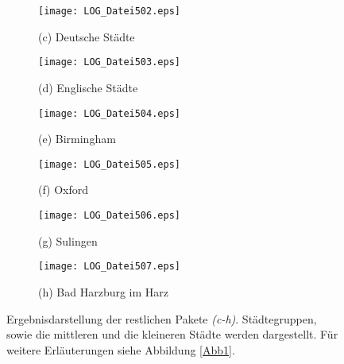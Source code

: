 \documentclass[fontsize=11pt, twoside, a4paper]{scrartcl}
\begin{document}
\begin{figure}[H]
\centering
	
	\begin{minipage}[b]{0.45\textwidth}
		\begin{figure}[H]
		\texttt{[image: LOG\_Datei502.eps]}
		\caption*{(c) Deutsche Städte}
		\end{figure}
	\end{minipage}	
	\begin{minipage}[b]{0.45\textwidth}
		\begin{figure}[H]
		\texttt{[image: LOG\_Datei503.eps]}
		\caption*{(d) Englische Städte}
		\end{figure}
	\end{minipage}

		\begin{minipage}[t]{0.45\textwidth}
		\begin{figure}[H]
		\texttt{[image: LOG\_Datei504.eps]}
		\caption*{(e) Birmingham}
		\end{figure}
	\end{minipage}	
	\begin{minipage}[t]{0.45\textwidth}
		\begin{figure}[H]
		\texttt{[image: LOG\_Datei505.eps]}
		\caption*{(f) Oxford}
		\end{figure}
	\end{minipage}
	
		\begin{minipage}[t]{0.45\textwidth}
		\begin{figure}[H]
		\texttt{[image: LOG\_Datei506.eps]}
		\caption*{(g) Sulingen}
		\end{figure}
	\end{minipage}	
	\begin{minipage}[t]{0.45\textwidth}
		\begin{figure}[H]
		\texttt{[image: LOG\_Datei507.eps]}
		\caption*{(h) Bad Harzburg im Harz}
		\end{figure}
	\end{minipage}
\caption{Ergebnisdarstellung der restlichen Pakete \textit{(c-h)}. Städtegruppen, sowie die mittleren und die kleineren Städte werden dargestellt. Für weitere Erläuterungen siehe Abbildung \ref{Abb1}.}
\end{figure}
\end{document}
